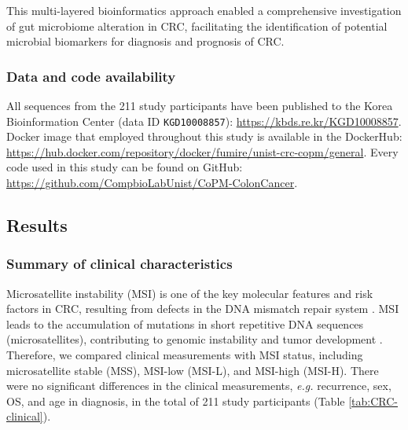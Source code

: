 \documentclass[11pt, a4paper, onecolumn, oneside]{report}
\begin{document}
                This multi-layered bioinformatics approach enabled a comprehensive investigation of gut microbiome alteration in CRC, facilitating the identification of potential microbial biomarkers for diagnosis and prognosis of CRC.

            \subsubsection{Data and code availability}
                All sequences from the 211 study participants have been published to the Korea Bioinformation Center (data ID \texttt{KGD10008857}): \url{https://kbds.re.kr/KGD10008857}.
                Docker image that employed throughout this study is available in the DockerHub: \url{https://hub.docker.com/repository/docker/fumire/unist-crc-copm/general}. Every code used in this study can be found on GitHub: \url{https://github.com/CompbioLabUnist/CoPM-ColonCancer}.
        \clearpage

        \subsection{Results}
            \subsubsection{Summary of clinical characteristics}
                Microsatellite instability (MSI) is one of the key molecular features and risk factors in CRC, resulting from defects in the DNA mismatch repair system \cite{CRC-MSI-1}. MSI leads to the accumulation of mutations in short repetitive DNA sequences (microsatellites), contributing to genomic instability and tumor development \cite{CRC-MSI-2, CRC-MSI-3}. Therefore, we compared clinical measurements with MSI status, including microsatellite stable (MSS), MSI-low (MSI-L), and MSI-high (MSI-H). There were no significant differences in the clinical measurements, \textit{e.g.} recurrence, sex, OS, and age in diagnosis, in the total of 211 study participants (Table \ref{tab:CRC-clinical}).
\end{document}

